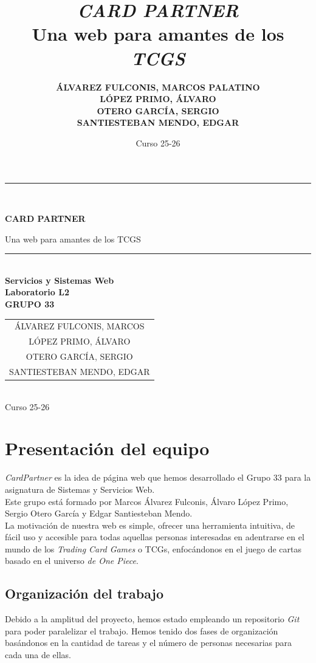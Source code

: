 \documentclass[10pt]{article}
\title{\textit{CARD PARTNER}\\ Una web para amantes de los \textit{TCGS}}
\author{
	\textbf{\small ÁLVAREZ FULCONIS, MARCOS PALATINO}\\
	\textbf{\small LÓPEZ PRIMO, ÁLVARO}\\
	\textbf{\small OTERO GARCÍA, SERGIO}\\
	\textbf{\small SANTIESTEBAN MENDO, EDGAR}
}
\date{Curso 25-26}
\begin{document}
	
	\begin{titlepage}
		\centering
		\rule{\linewidth}{0.2mm}\\[0.4cm]
		{\huge\bfseries CARD PARTNER\par}
		{\large Una web para amantes de los TCGS\par}
		\rule{\linewidth}{0.2mm}\\[1.5cm]
		{\Large\bfseries Servicios y Sistemas Web}\\[0.3cm]
		{\large\bfseries Laboratorio L2 \\ GRUPO 33}\\[1cm]
		{\Large \begin{tabular}{c} ÁLVAREZ FULCONIS, MARCOS \\ LÓPEZ PRIMO, ÁLVARO \\ OTERO GARCÍA, SERGIO \\ SANTIESTEBAN MENDO, EDGAR \end{tabular}}\\[1.5cm]
		{\Large Curso 25-26}
	\end{titlepage}
	
	\tableofcontents \newpage
	
	\setcounter{page}{1}
	
	\section{Presentación del equipo}
	\textit{CardPartner} es la idea de página web que hemos desarrollado el Grupo 33 para la asignatura de Sistemas y Servicios Web.\\
	Este grupo está formado por Marcos Álvarez Fulconis, Álvaro López Primo, Sergio Otero García y Edgar Santiesteban Mendo.\\
	La motivación de nuestra web es simple, ofrecer una herramienta intuitiva, de fácil uso y accesible para todas aquellas personas interesadas en adentrarse en el mundo de los \textit{Trading Card Games} o TCGs, enfocándonos en el juego de cartas basado en el universo \textit{de One Piece}.\\
	
	\subsection{Organización del trabajo}
	Debido a la amplitud del proyecto, hemos estado empleando un repositorio \textit{Git} para poder paralelizar el trabajo. Hemos tenido dos fases de organización basándonos en la cantidad de tareas y el número de personas necesarias para cada una de ellas.\\
	
\end{document}
